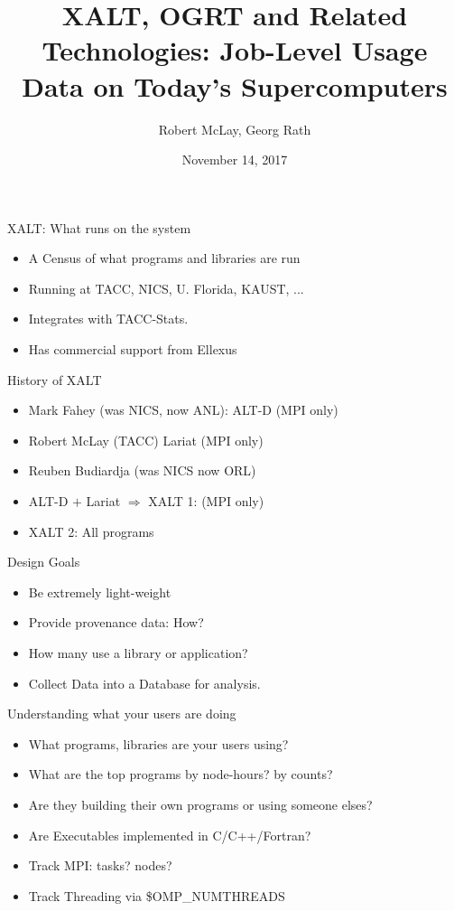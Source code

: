 \documentclass{beamer}
\title{ XALT, OGRT and Related Technologies: Job-Level Usage Data on Today's Supercomputers}
\author{Robert McLay, Georg Rath}
\institute{The Texas Advanced Computing Center, NERSC}
\date{November 14, 2017}  %
\begin{document}
\begin{frame}
  \titlepage
\end{frame}

\begin{frame}{XALT: What runs on the system}
  \begin{itemize}
    \item A Census of what programs and libraries are run
    \item Running at TACC, NICS, U. Florida, KAUST, ...
    \item Integrates with TACC-Stats.
    \item Has commercial support from Ellexus 
  \end{itemize}
\end{frame}

\begin{frame}{History of XALT}
  \begin{itemize}
    \item Mark Fahey (was NICS, now ANL): ALT-D (MPI only)
    \item Robert McLay (TACC) Lariat (MPI only)
    \item Reuben Budiardja (was NICS now ORL)
    \item ALT-D $+$ Lariat $\Rightarrow$ XALT 1: (MPI only)
    \item XALT 2: All programs
  \end{itemize}
\end{frame}

\begin{frame}{Design Goals}
  \begin{itemize}
    \item Be extremely light-weight
    \item Provide provenance data: How?
    \item How many use a library or application?
    \item Collect Data into a Database for analysis.
  \end{itemize}
\end{frame}

\begin{frame}{Understanding what your users are doing}
  \begin{itemize}
    \item What programs, libraries are your users using?
    \item What are the top programs by node-hours? by counts?
    \item Are they building their own programs or using someone elses?
    \item Are Executables implemented in C/C++/Fortran?
    \item Track MPI: tasks? nodes?
    \item Track Threading via \$OMP\_NUMTHREADS
  \end{itemize}
\end{frame}
\end{document}
